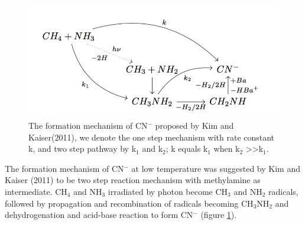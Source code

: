 \begin{figure}
\centering
\includegraphics[width=\textwidth]{figures/chapter3/CNmechanism}
\caption{The formation mechanism of CN$^-$ proposed by Kim and Kaiser(2011)\cite{kim}, we denote the one step mechanism with rate constant k, and two step pathway by k$_1$ and k$_2$; k equals k$_1$ when k$_2$ >>k$_1$.}
\label{fig:CNmechanism}
\end{figure}

The formation mechanism of CN$^-$ at low temperature was suggested by Kim and Kaiser (2011) to be two step reaction mechanism with methylamine as intermediate\cite{kim}. CH$_4$ and NH$_3$ irradiated by photon become CH$_3$ and NH$_2$ radicals, followed by propagation and recombination of radicals becoming CH$_3$NH$_2$ and dehydrogenation and acid-base reaction to form CN$^-$ (figure \ref{fig:CNmechanism}).



